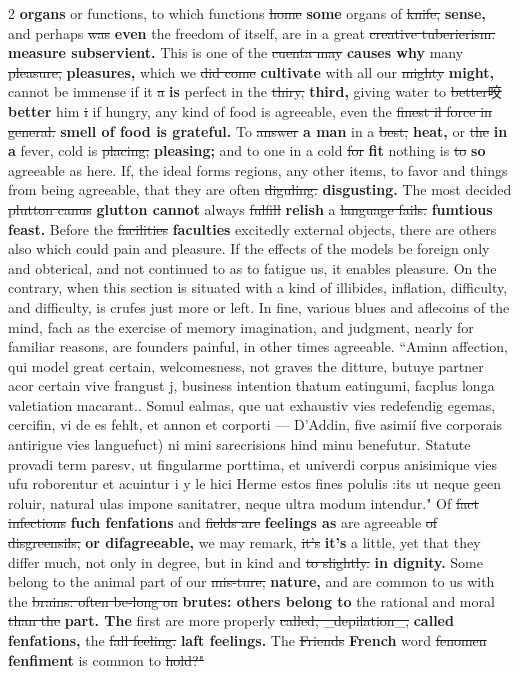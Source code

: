 \documentclass[10pt]{article}
\begin{document}
\begin{multicols}{2}
\textbf{organs} or functions, to which functions \sout{home} \textbf{some} organs of \sout{knife,} \textbf{sense,} and perhaps \sout{was} \textbf{even} the freedom of itself, are in a great \sout{creative tuberierism.} \textbf{measure subservient.} This is one of the \sout{cuenta may} \textbf{causes why} many \sout{pleasure,} \textbf{pleasures,} which we \sout{did come} \textbf{cultivate} with all our \sout{mighty} \textbf{might,} cannot be immense if it \sout{a} \textbf{is} perfect in the \sout{thiry,} \textbf{third,} giving water to \sout{better咬} \textbf{better} him \sout{i} if hungry, any kind of food is agreeable, even the \sout{finest il force in general.} \textbf{smell of food is grateful.} To \sout{answer} \textbf{a man} in a \sout{best,} \textbf{heat,} or \sout{the} \textbf{in a} fever, cold is \sout{placing;} \textbf{pleasing;} and to one in a cold \sout{for} \textbf{fit} nothing is \sout{to} \textbf{so} agreeable as here. If, the ideal forms regions, any other items, to favor and things from being agreeable, that they are often \sout{diguling.} \textbf{disgusting.} The most decided \sout{plutton canus} \textbf{glutton cannot} always \sout{fulfill} \textbf{relish} a \sout{language fails.} \textbf{fumtious feast.} Before the \sout{facilities} \textbf{faculties} excitedly external objects, there are others also which could pain and pleasure. If the effects of the models be foreign only and obterical, and not continued to as to fatigue us, it enables pleasure. On the contrary, when this section is situated with a kind of illibides, inflation, difficulty, and difficulty, is crufes just more or left. In fine, various blues and aflecoins of the mind, fach as the exercise of memory imagination, and judgment, nearly for familiar reasons, are founders painful, in other times agreeable. “Aminn affection, qui model great certain, welcomesness, not graves the ditture, butuye partner acor certain vive frangust j, business intention thatum eatingumi, facplus longa valetiation macarant.. Somul ealmas, que uat exhaustiv vies redefendig egemas, cercifin, vi de es fehlt, et annon et corporti — D'Addin, five asimií five corporais antirigue vies languefuct) ni mini sarecrisions hind minu benefutur. Statute provadi term paresv, ut fingularme porttima, et univerdi corpus anisimique vies ufu roborentur et acuintur i y le hici Herme estos fines polulis :its ut neque geen roluir, natural ulas impone sanitatrer, neque ultra modum intendur." Of \sout{fact infections} \textbf{fuch fenfations} and \sout{fields are} \textbf{feelings as} are agreeable \sout{of disgreensils,} \textbf{or difagreeable,} we may remark, \sout{it’s} \textbf{it's} a little, yet that they differ much, not only in degree, but in kind and \sout{to slightly.} \textbf{in dignity.} Some belong to the animal part of our \sout{mis-ture,} \textbf{nature,} and are common to us with the \sout{brains: often be-long on} \textbf{brutes: others belong to} the rational and moral \sout{than the} \textbf{part. The} first are more properly \sout{called, \_depilation\_,} \textbf{called fenfations,} the \sout{fall feeling.} \textbf{laft feelings.} The \sout{Friends} \textbf{French} word \sout{fenomen} \textbf{fenfiment} is common to \sout{hold?"} 
\end{multicols}
\end{document}
